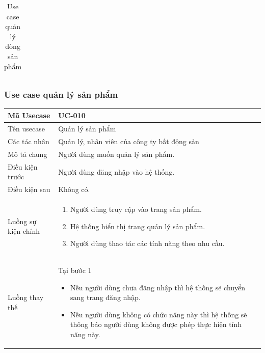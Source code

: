 \documentclass[12pt,a4paper]{article}
\begin{document}
\begin{table}[H]
\begin{tabular}{|p{3.5cm}|p{11.5cm}|c|}
            \\ \hline
        \end{tabular}
        \caption{Use case quản lý dòng sản phẩm}

    \end{table}


    \subsubsection*{Use case quản lý sản phẩm}
    \begin{table}[H]
        \centering
        \begin{tabular}{|p{3.5cm}|p{11.5cm}|c|}
            \hline
            Mã Usecase      & UC-010                                      \\
            \hline
            Tên usecase     & Quản lý sản phẩm                            \\
            \hline
            Các tác nhân    & Quản lý, nhân viên của công ty bất động sản \\
            \hline
            Mô tả chung     & Người dùng muốn quản lý sản phẩm.           \\
            \hline

            Điều kiện trước & Người dùng đăng nhập vào hệ thống.          \\
            \hline

            Điều kiện sau   & Không có.                                   \\
            \hline

            Luồng sự kiện chính & \vspace{-.8cm}\begin{enumerate}
                                                    \item Người dùng truy cập vào trang sản phẩm.
                                                    \item Hệ thống hiển thị trang quản lý sản phẩm.
                                                    \item Người dùng thao tác các tính năng theo nhu cầu.
            \end{enumerate}
            \\
            \hline
            Luồng thay thế & Tại bước 1\newline
            \vspace{-.8cm}\begin{itemize}
                              \item Nếu người dùng chưa đăng nhập thì hệ thống sẽ chuyển sang trang đăng nhập.
                              \item Nếu người dùng không có chức năng này thì hệ thống sẽ thông báo người dùng không được phép thực hiện tính năng này.
            \end{itemize}


\end{tabular}
\end{table}
\end{document}
